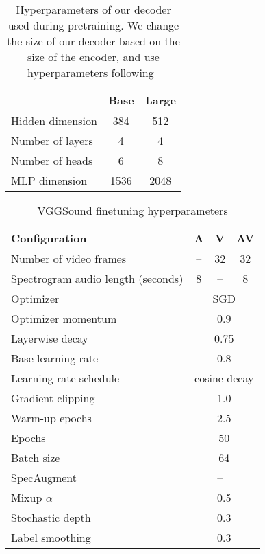 \documentclass[10pt,twocolumn,letterpaper]{article}
\begin{document}
\begin{table}[t]  
	\caption{Hyperparameters of our decoder used during pretraining. We change the size of our decoder based on the size of the encoder, and use hyperparameters following~\cite{he2022masked, feichtenhofer2022masked, tong2022videomae}}
	\centering
	\vspace{-0.6\baselineskip}
	\begin{tabular}{lcc}
		\toprule
		&  Base  & Large   \\ \midrule 
		Hidden dimension   &  384 & 512 \\
		Number of layers    &  4 & 4 \\
		Number of heads     &  6 & 8 \\   
		MLP dimension       & 1536  & 2048 \\ 
		\bottomrule
	\end{tabular}
	\label{tab:hyperparams_decoder}
\end{table} 

\begin{table}[t] 
	\caption{VGGSound finetuning hyperparameters}
	\vspace{-0.6\baselineskip}
	\centering
		\begin{tabular}{lccc}
			\toprule  
			Configuration        & A & V & AV \\
			\midrule
			Number of video frames     & -- & 32 & 32\\
			Spectrogram audio length (seconds)    & 8 & -- & 8  \\
			\midrule
			Optimizer              &  \multicolumn{3}{c}{SGD}  \\
			Optimizer momentum        &  \multicolumn{3}{c}{0.9} \\
			Layerwise decay~\cite{bao2021beit,clark2020electra}    &  \multicolumn{3}{c}{0.75} \\
			Base learning rate          & \multicolumn{3}{c}{0.8} \\
			Learning rate schedule     & \multicolumn{3}{c}{cosine decay}\\
			Gradient clipping        & \multicolumn{3}{c}{1.0}    \\  
			Warm-up epochs          & \multicolumn{3}{c}{2.5} \\
			Epochs                 & \multicolumn{3}{c}{50} \\
			Batch size             & \multicolumn{3}{c}{64} \\
			\midrule 
		    SpecAugment \cite{park2019specaugment}   & \checkmark  & -- & \checkmark \\
			Mixup $\alpha$ \cite{zhang_mixup_iclr_2018}           &   \multicolumn{3}{c}{0.5} \\
			Stochastic depth  \cite{huang_stochasticdepth_eccv_2016}    &  \multicolumn{3}{c}{0.3}   \\
			Label smoothing  \cite{szegedy_cvpr_2016}          &  \multicolumn{3}{c}{0.3}   \\
			\bottomrule
		\end{tabular}
		\label{tab:hyperparams_vggsound}
\end{table}
\end{document}
